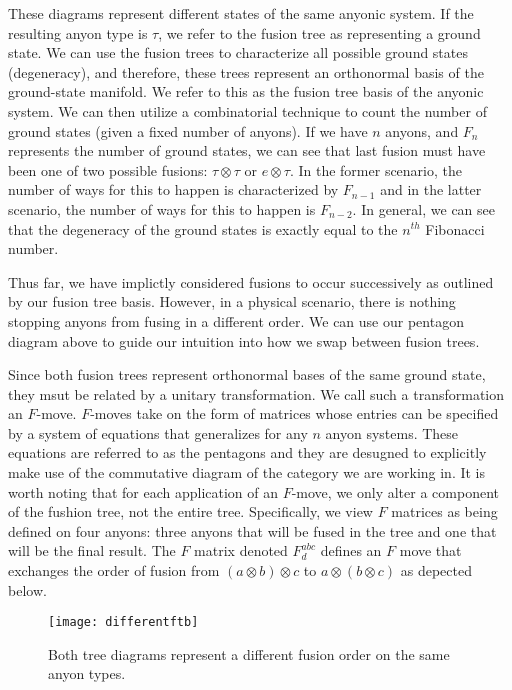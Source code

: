These diagrams represent different states of the same anyonic system. If the resulting anyon type is $\tau$, we refer to the fusion tree as representing a ground state. We can use the fusion trees to characterize all possible ground states (degeneracy), and therefore, these trees represent an orthonormal basis of the ground-state manifold\cite{Trebst}. We refer to this as the fusion tree basis of the anyonic system. We can then utilize a combinatorial technique to count the number of ground states (given a fixed number of anyons). If we have $n$ anyons, and $F_n$ represents the number of ground states, we can see that last fusion must have been one of two possible fusions: $\tau\otimes \tau$ or $e \otimes \tau$. In the former scenario, the number of ways for this to happen is characterized by $F_{n-1}$ and in the latter scenario, the number of ways for this to happen is $F_{n-2}$. In general, we can see that the degeneracy of the ground states is exactly equal to the $n^{th}$ Fibonacci number.

Thus far, we have implictly considered fusions to occur successively as outlined by our fusion tree basis. However, in a physical scenario, there is nothing stopping anyons from fusing in a different order. We can use our pentagon diagram above to guide our intuition into how we swap between fusion trees.

Since both fusion trees represent orthonormal bases of the same ground state, they msut be related by a unitary transformation. We call such a transformation an $F$-move. $F$-moves take on the form of matrices whose entries can be specified by a system of equations that generalizes for any $n$ anyon systems. These equations are referred to as the pentagons and they are desugned to explicitly make use of the commutative diagram of the category we are working in. It is worth noting that for each application of an $F$-move, we only alter a component of the fushion tree, not the entire tree. Specifically, we view $F$ matrices as being defined on four anyons: three anyons that will be fused in the tree and one that will be the final result. The $F$ matrix denoted $F^{abc}_d$ defines an $F$ move that exchanges the order of fusion from $(a\otimes b)\otimes c$ to $a\otimes(b\otimes c)$ as depected below.

\begin{figure}[H]
	\centering
	\texttt{[image: differentftb]}
	\caption{Both tree diagrams represent a different fusion order on the same anyon types.}
\end{figure}

